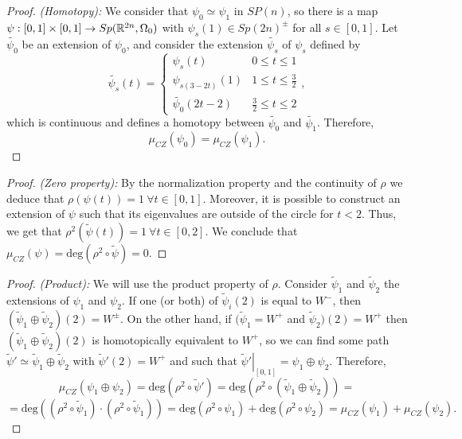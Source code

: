 \begin{proof} {\it (Homotopy):} We consider that $\psi_0 \simeq \psi_1$ in $SP(n)$, so there is a map $\psi : [0,1] \times [0,1] \rightarrow Sp(\mathbb{R}^{2n},\Omega_0)$ with $\psi_s(1) \in Sp(2n)^{\pm}$ for all $s \in [0,1]$.
Let $\widetilde{\psi_0}$ be an extension of $\psi_0$, and consider the extension $\widetilde{\psi_s}$ of $\psi_s$ defined by
\[\widetilde{\psi_s}(t) = \left\{ \begin{array}{lc} \psi_s(t) & 0 \leq t \leq 1 \\ \psi_{s(3-2t)}(1) & 1 \leq t \leq \frac32 \\ \widetilde{\psi_0}(2t-2) & \frac32 \leq t \leq 2 \end{array} \right. ,\]
which is continuous and defines a homotopy between $\widetilde{\psi_0}$ and $\widetilde{\psi_1}$. Therefore,
\[\mu_{CZ}(\psi_0) = \mu_{CZ}(\psi_1) .\]
\end{proof}

\begin{proof} {\it (Zero property):} By the normalization property and the continuity of $\rho$ we deduce that $\rho(\psi(t)) = 1 \ \forall t \in [0,1]$. Moreover, it is possible to construct an extension of $\psi$ such that its eigenvalues are outside of the circle for $t < 2$. Thus, we get that $\rho^2(\widetilde{\psi}(t)) = 1 \ \forall t \in [0,2]$. We conclude that $\mu_{CZ}(\psi) = \text{deg}(\rho^2 \circ \widetilde{\psi}) = 0$.
\end{proof}

\begin{proof} {\it (Product):} We will use the product property of $\rho$. Consider $\widetilde{\psi}_1$ and $\widetilde{\psi}_2$ the extensions of $\psi_1$ and $\psi_2$. If one (or both) of $\widetilde{\psi}_i(2)$ is equal to $W^-$, then $(\widetilde{\psi}_1 \oplus \widetilde{\psi}_2)(2) = W^{\pm}$. On the other hand, if $(\widetilde{\psi}_1 = W^+$ and $\widetilde{\psi}_2)(2) = W^+$ then $(\widetilde{\psi}_1 \oplus \widetilde{\psi}_2)(2)$ is homotopically equivalent to $W^+$, so we can find some path $\widetilde{\psi}' \simeq \widetilde{\psi}_1 \oplus \widetilde{\psi}_2$ with $\widetilde{\psi}'(2) = W^+$ and such that $\left. \widetilde{\psi}' \right|_{[0,1]} = \psi_1 \oplus \psi_2$. Therefore,
\[\mu_{CZ}(\psi_1 \oplus \psi_2) = \text{deg}(\rho^2 \circ \widetilde{\psi}') = \text{deg}(\rho^2 \circ (\widetilde{\psi}_1 \oplus \widetilde{\psi}_2)) =\]
\[= \text{deg}((\rho^2 \circ \widetilde{\psi}_1) \cdot (\rho^2 \circ \widetilde{\psi}_1)) = \text{deg}(\rho^2 \circ \psi_1) + \text{deg}(\rho^2 \circ \psi_2) = \mu_{CZ}(\psi_1) + \mu_{CZ}(\psi_2) .\]
\end{proof}

